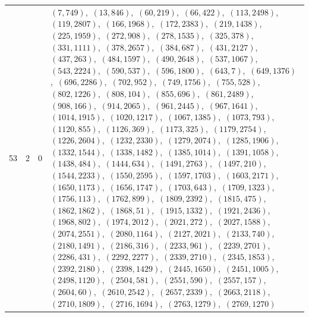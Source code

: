 \documentclass[11pt]{article}
\begin{document}
\begin{longtable}{@{}rrl>{\raggedright\arraybackslash}p{}@{}}
53 & 2 & $0$ & $(7,749)$,\allowbreak\ $(13,846)$,\allowbreak\ $(60,219)$,\allowbreak\ $(66,422)$,\allowbreak\ $(113,2498)$,\allowbreak\ $(119,2807)$,\allowbreak\ $(166,1968)$,\allowbreak\ $(172,2383)$,\allowbreak\ $(219,1438)$,\allowbreak\ $(225,1959)$,\allowbreak\ $(272,908)$,\allowbreak\ $(278,1535)$,\allowbreak\ $(325,378)$,\allowbreak\ $(331,1111)$,\allowbreak\ $(378,2657)$,\allowbreak\ $(384,687)$,\allowbreak\ $(431,2127)$,\allowbreak\ $(437,263)$,\allowbreak\ $(484,1597)$,\allowbreak\ $(490,2648)$,\allowbreak\ $(537,1067)$,\allowbreak\ $(543,2224)$,\allowbreak\ $(590,537)$,\allowbreak\ $(596,1800)$,\allowbreak\ $(643,7)$,\allowbreak\ $(649,1376)$,\allowbreak\ $(696,2286)$,\allowbreak\ $(702,952)$,\allowbreak\ $(749,1756)$,\allowbreak\ $(755,528)$,\allowbreak\ $(802,1226)$,\allowbreak\ $(808,104)$,\allowbreak\ $(855,696)$,\allowbreak\ $(861,2489)$,\allowbreak\ $(908,166)$,\allowbreak\ $(914,2065)$,\allowbreak\ $(961,2445)$,\allowbreak\ $(967,1641)$,\allowbreak\ $(1014,1915)$,\allowbreak\ $(1020,1217)$,\allowbreak\ $(1067,1385)$,\allowbreak\ $(1073,793)$,\allowbreak\ $(1120,855)$,\allowbreak\ $(1126,369)$,\allowbreak\ $(1173,325)$,\allowbreak\ $(1179,2754)$,\allowbreak\ $(1226,2604)$,\allowbreak\ $(1232,2330)$,\allowbreak\ $(1279,2074)$,\allowbreak\ $(1285,1906)$,\allowbreak\ $(1332,1544)$,\allowbreak\ $(1338,1482)$,\allowbreak\ $(1385,1014)$,\allowbreak\ $(1391,1058)$,\allowbreak\ $(1438,484)$,\allowbreak\ $(1444,634)$,\allowbreak\ $(1491,2763)$,\allowbreak\ $(1497,210)$,\allowbreak\ $(1544,2233)$,\allowbreak\ $(1550,2595)$,\allowbreak\ $(1597,1703)$,\allowbreak\ $(1603,2171)$,\allowbreak\ $(1650,1173)$,\allowbreak\ $(1656,1747)$,\allowbreak\ $(1703,643)$,\allowbreak\ $(1709,1323)$,\allowbreak\ $(1756,113)$,\allowbreak\ $(1762,899)$,\allowbreak\ $(1809,2392)$,\allowbreak\ $(1815,475)$,\allowbreak\ $(1862,1862)$,\allowbreak\ $(1868,51)$,\allowbreak\ $(1915,1332)$,\allowbreak\ $(1921,2436)$,\allowbreak\ $(1968,802)$,\allowbreak\ $(1974,2012)$,\allowbreak\ $(2021,272)$,\allowbreak\ $(2027,1588)$,\allowbreak\ $(2074,2551)$,\allowbreak\ $(2080,1164)$,\allowbreak\ $(2127,2021)$,\allowbreak\ $(2133,740)$,\allowbreak\ $(2180,1491)$,\allowbreak\ $(2186,316)$,\allowbreak\ $(2233,961)$,\allowbreak\ $(2239,2701)$,\allowbreak\ $(2286,431)$,\allowbreak\ $(2292,2277)$,\allowbreak\ $(2339,2710)$,\allowbreak\ $(2345,1853)$,\allowbreak\ $(2392,2180)$,\allowbreak\ $(2398,1429)$,\allowbreak\ $(2445,1650)$,\allowbreak\ $(2451,1005)$,\allowbreak\ $(2498,1120)$,\allowbreak\ $(2504,581)$,\allowbreak\ $(2551,590)$,\allowbreak\ $(2557,157)$,\allowbreak\ $(2604,60)$,\allowbreak\ $(2610,2542)$,\allowbreak\ $(2657,2339)$,\allowbreak\ $(2663,2118)$,\allowbreak\ $(2710,1809)$,\allowbreak\ $(2716,1694)$,\allowbreak\ $(2763,1279)$,\allowbreak\ $(2769,1270)$\\

\end{longtable}
\end{document}
